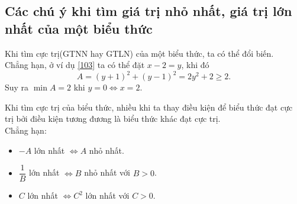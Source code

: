 \subsection{Các chú ý khi tìm giá trị nhỏ nhất, giá trị lớn nhất của một biểu thức}
\begin{note}
	Khi tìm cực trị(GTNN hay GTLN) của một biểu thức, ta có thể đổi biến.\\ 
	Chẳng hạn, ở ví dụ \ref{103} ta có thể đặt $ x-2=y $, khi đó 
	\[A=(y+1)^2+(y-1)^2=2y^2+2\ge 2.\] 
	Suy ra $ \min A=2 $ khi $ y=0 \Leftrightarrow x=2$.
\end{note}
\begin{note}
	Khi tìm cực trị của biểu thức, nhiều khi ta thay điều kiện để biểu thức đạt cực trị bởi điều kiện tương đương là biểu thức khác đạt cực trị.\\ 
	Chẳng hạn:
	\begin{itemize}
		\item $ -A $ lớn nhất $ \Leftrightarrow A $ nhỏ nhất.
		\item $ \dfrac{1}{B} $ lớn nhất $ \Leftrightarrow B $ nhỏ nhất với $ B>0 $.
		\item $ C $ lớn nhất $ \Leftrightarrow C^2 $ lớn nhất với $ C>0 $.
	\end{itemize}
\end{note}

